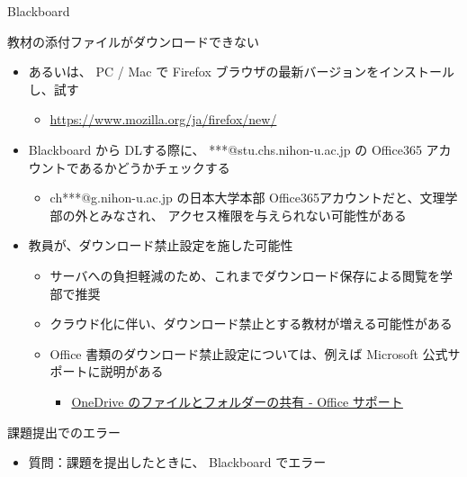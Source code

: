 \documentclass[a4j,10pt]{jsarticle}
\begin{document}
{\begin{frame}[label={sec:orgc119bb0},fragile]{Blackboard}
\begin{block}{教材の添付ファイルがダウンロードできない}
\begin{itemize}
\begin{itemize}
\item \url{https://www.google.com/intl/ja\_jp/chrome/}
\item Web ブラウザを変更するだけで解決することも多い
\end{itemize}
\par
\item あるいは、 PC / Mac で Firefox ブラウザの最新バージョンをインストールし、試す
\begin{itemize}
\item \url{https://www.mozilla.org/ja/firefox/new/}
\end{itemize}
\par
\item Blackboard から DLする際に、 ***@stu.chs.nihon-u.ac.jp の Office365 アカウントであるかどうかチェックする
\begin{itemize}
\item ch***@g.nihon-u.ac.jp の日本大学本部 Office365アカウントだと、文理学部の外とみなされ、
アクセス権限を与えられない可能性がある
\end{itemize}
\par
\item 教員が、ダウンロード禁止設定を施した可能性
\begin{itemize}
\item サーバへの負担軽減のため、これまでダウンロード保存による閲覧を学部で推奨
\item クラウド化に伴い、ダウンロード禁止とする教材が増える可能性がある
\item Office 書類のダウンロード禁止設定については、例えば Microsoft 公式サポートに説明がある
\begin{itemize}
\item \href{https://support.microsoft.com/ja-jp/office/onedrive-\%E3\%81\%AE\%E3\%83\%95\%E3\%82\%A1\%E3\%82\%A4\%E3\%83\%AB\%E3\%81\%A8\%E3\%83\%95\%E3\%82\%A9\%E3\%83\%AB\%E3\%83\%80\%E3\%83\%BC\%E3\%81\%AE\%E5\%85\%B1\%E6\%9C\%89-9fcc2f7d-de0c-4cec-93b0-a82024800c07}{OneDrive のファイルとフォルダーの共有 - Office サポート}
\end{itemize}
\end{itemize}
\end{itemize}
\end{block}
\par
\begin{block}{課題提出でのエラー}
\begin{itemize}
\item 質問：課題を提出したときに、 Blackboard でエラー

\end{itemize}
\end{block}
\end{frame}}
\end{document}
